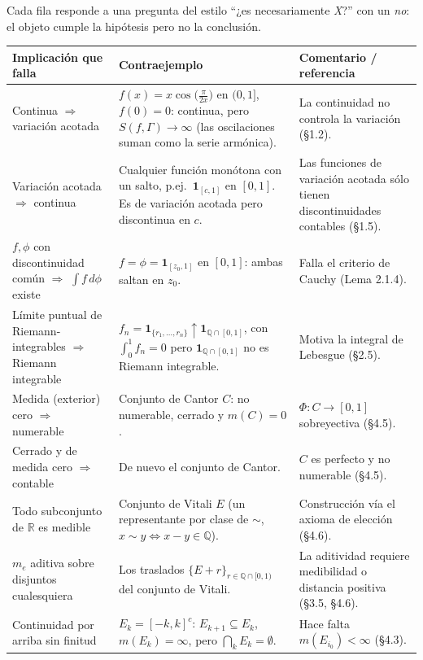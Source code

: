\documentclass[11pt,twoside]{article}
\newcommand{\R}{\mathbb{R}}
\newcommand{\Q}{\mathbb{Q}}
\newcommand{\ind}{\mathbf{1}}                 %
\begin{document}
Cada fila responde a una pregunta del estilo ``¿es necesariamente \textit{X}?'' con un \textit{no}: el objeto cumple la hip\'otesis pero no la conclusi\'on.

\renewcommand{\arraystretch}{1.35}
\begin{longtable}{p{} p{} p{}}
\hline
\textbf{Implicaci\'on que falla} & \textbf{Contraejemplo} & \textbf{Comentario / referencia} \\
\hline
\endhead

Continua $\Rightarrow$ variaci\'on acotada & $f(x) = x\cos\!\big(\tfrac{\pi}{2x}\big)$ en $(0,1]$, $f(0) = 0$: continua, pero $S(f, \Gamma) \to \infty$ (las oscilaciones suman como la serie arm\'onica). & La continuidad no controla la variaci\'on (§1.2).\\
\hline
Variaci\'on acotada $\Rightarrow$ continua & Cualquier funci\'on mon\'otona con un salto, p.ej.\ $\ind_{[c,1]}$ en $[0,1]$. Es de variaci\'on acotada pero discontinua en $c$. & Las funciones de variaci\'on acotada s\'olo tienen discontinuidades contables (§1.5).\\
\hline
$f, \phi$ con discontinuidad com\'un $\Rightarrow$ $\int f\,d\phi$ existe & $f = \phi = \ind_{[z_{0}, 1]}$ en $[0,1]$: ambas saltan en $z_{0}$. & Falla el criterio de Cauchy (Lema 2.1.4).\\
\hline
L\'imite puntual de Riemann-integrables $\Rightarrow$ Riemann integrable & $f_{n} = \ind_{\{r_{1}, \dots, r_{n}\}} \uparrow \ind_{\Q \cap [0,1]}$, con $\int_{0}^{1} f_{n} = 0$ pero $\ind_{\Q \cap [0,1]}$ no es Riemann integrable. & Motiva la integral de Lebesgue (§2.5).\\
\hline
Medida (exterior) cero $\Rightarrow$ numerable & Conjunto de Cantor $C$: no numerable, cerrado y $m(C) = 0$. & $\Phi : C \to [0,1]$ sobreyectiva (§4.5).\\
\hline
Cerrado y de medida cero $\Rightarrow$ contable & De nuevo el conjunto de Cantor. & $C$ es perfecto y no numerable (§4.5).\\
\hline
Todo subconjunto de $\R$ es medible & Conjunto de Vitali $E$ (un representante por clase de $\sim$, $x \sim y \iff x - y \in \Q$). & Construcci\'on v\'ia el axioma de elecci\'on (§4.6).\\
\hline
$m_{e}$ aditiva sobre disjuntos cualesquiera & Los traslados $\{E + r\}_{r \in \Q \cap [0,1)}$ del conjunto de Vitali. & La aditividad requiere medibilidad o distancia positiva (§3.5, §4.6).\\
\hline
Continuidad por arriba sin finitud & $E_{k} = [-k, k]^{c}$: $E_{k+1} \subseteq E_{k}$, $m(E_{k}) = \infty$, pero $\bigcap_{k} E_{k} = \emptyset$. & Hace falta $m(E_{i_{0}}) < \infty$ (§4.3).\\

\end{longtable}
\end{document}
